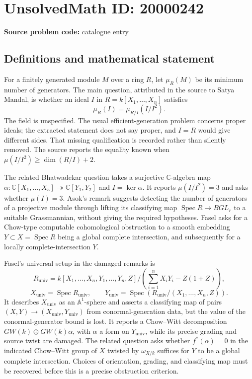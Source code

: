 \documentclass[11pt]{article}
\newcommand{\C}{\mathbb{C}}
\newcommand{\A}{\mathbb{A}}
\begin{document}
\section*{UnsolvedMath ID: 20000242}
\textbf{Source problem code:} catalogue entry
\subsection{Definitions and mathematical statement}
For a finitely generated module $M$ over a ring $R$, let $\mu_R(M)$ be its minimum number of generators. The main question, attributed in the source to Satya Mandal, is whether an ideal $I$ in $R=k[X_1,\ldots,X_n]$ satisfies
\[
 \mu_R(I)=\mu_{R/I}(I/I^2).
\]
The field is unspecified. The usual efficient-generation problem concerns proper ideals; the extracted statement does not say proper, and $I=R$ would give different sides. That missing qualification is recorded rather than silently removed. The source reports the equality known when $\mu(I/I^2)\geq\dim(R/I)+2$.

The related Bhatwadekar question takes a surjective $\C$-algebra map $\alpha:\C[X_1,\ldots,X_5]\twoheadrightarrow\C[Y_1,Y_2]$ and $I=\ker\alpha$. It reports $\mu(I/I^2)=3$ and asks whether $\mu(I)=3$. Asok's remark suggests detecting the number of generators of a projective module through lifting its classifying map $\operatorname{Spec}R\to BGL_r$ to a suitable Grassmannian, without giving the required hypotheses. Fasel asks for a Chow-type computable cohomological obstruction to a smooth embedding $Y\subset X=\operatorname{Spec}R$ being a global complete intersection, and subsequently for a locally complete-intersection $Y$.

Fasel's universal setup in the damaged remarks is
\[
 R_{\mathrm{univ}}=k[X_1,\ldots,X_n,Y_1,\ldots,Y_n,Z]/
       (\textstyle\sum_{i=1}^nX_iY_i-Z(1+Z)),
\]
\[
 X_{\mathrm{univ}}=\operatorname{Spec}R_{\mathrm{univ}},\qquad
 Y_{\mathrm{univ}}=\operatorname{Spec}(R_{\mathrm{univ}}/(X_1,\ldots,X_n,Z)).
\]
It describes $X_{\mathrm{univ}}$ as an $\A^1$-sphere and asserts a classifying map of pairs $(X,Y)\to(X_{\mathrm{univ}},Y_{\mathrm{univ}})$ from conormal-generation data, but the value of the conormal-generator bound is lost. It reports a Chow--Witt decomposition $GW(k)\oplus GW(k)\alpha$, with $\alpha$ a form on $Y_{\mathrm{univ}}$, while its precise grading and source twist are damaged. The related question asks whether $f^*(\alpha)=0$ in the indicated Chow--Witt group of $X$ twisted by $\omega_{X/k}$ suffices for $Y$ to be a global complete intersection. Choices of orientation, grading, and classifying map must be recovered before this is a precise obstruction criterion.
\end{document}
